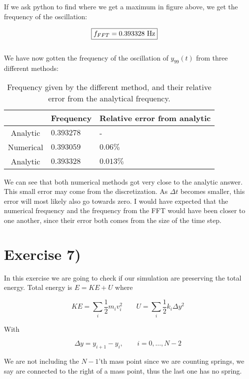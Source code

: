 \documentclass[a4paper,norsk, 10pt]{article}
\begin{document}
If we ask python to find where we get a maximum in figure above, we get the frequency of the oscillation:

\begin{align}
\Aboxed{f_{FFT} = 0.393328 \text{ Hz}}
\end{align}\\

We have now gotten the frequency of the oscillation of $y_{99}(t)$ from three different methods:

\begin{table}[H]
\centering
\begin{tabular}{|c|l|l|}
\hline
& Frequency & Relative error from analytic\\\hline
Analytic & $0.393278$ & - \\\hline
Numerical & $0.393059$ & $0.06\%$ \\\hline
Analytic & $0.393328$ & $0.013\%$ \\\hline
\end{tabular}
\caption{Frequency given by the different method, and their relative error from the analytical frequency.}
\end{table}

We can see that both numerical methods got very close to the analytic answer. This small error may come from the discretization. As $\Delta t$ becomes smaller, this error will most likely also go towards zero. I would have expected that the numerical frequency and the frequency from the FFT would have been closer to one another, since their error both comes from the size of the time step.

\section{Exercise 7)}
In this exercise we are going to check if our simulation are preserving the total energy. Total energy is $E = KE + U$ where

\begin{equation}
KE = \sum_i \frac{1}{2}m_iv_i^2 \qquad U = \sum_i \frac{1}{2}k_i\Delta y^2
\end{equation}

With

\begin{equation}
\Delta y = y_{i+1} - y_i, \qquad i = 0,\ldots,N-2
\end{equation} 

We are not including the $N-1$'th mass point since we are counting springs, we say are connected to the right of a mass point, thus the last one has no spring.\\
\end{document}
